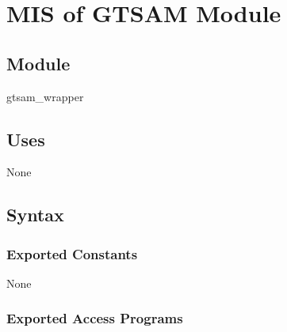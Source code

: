 \documentclass[12pt, titlepage]{article}
\begin{document}




\newpage

\section{MIS of GTSAM Module} \label{M_GTSAM} 



\subsection{Module}

gtsam\_wrapper

\subsection{Uses}
None

\subsection{Syntax}

\subsubsection{Exported Constants}
None
\subsubsection{Exported Access Programs}
\end{document}

